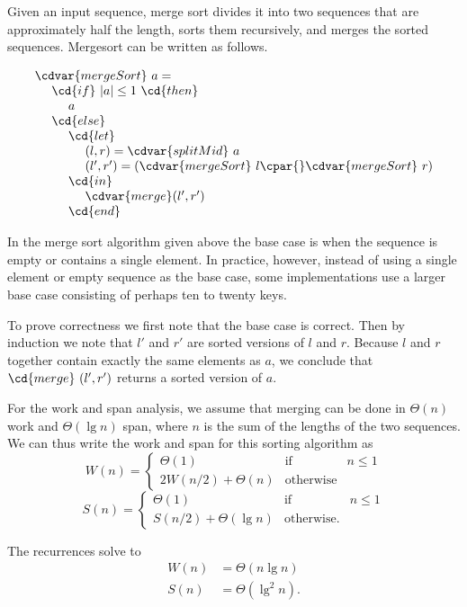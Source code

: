 \begin{algorithm}
\label{alg:design::dc::mergesort}

Given an input sequence, merge sort divides it into two sequences that
are approximately half the length, sorts them recursively, and merges
the sorted sequences.
%
Mergesort can be written as follows.

\[
\begin{array}{l}
\cdvar{mergeSort}~a =
\\ 
~~~~\cd{if}~|a| \leq 1~\cd{then}
\\ 
~~~~~~~~a
\\
~~~~\cd{else}
\\ 
~~~~~~~~\cd{let}
\\
~~~~~~~~~~~~(l,r) = \cdvar{splitMid}~a
\\ 
~~~~~~~~~~~~(l',r') = (\cdvar{mergeSort}~l \cpar{} \cdvar{mergeSort}~r)
\\
~~~~~~~~\cd{in}
\\ 
~~~~~~~~~~~~\cdvar{merge} (l',r')
\\
~~~~~~~~\cd{end}
\end{array} 
\]
\end{algorithm}


\begin{note}
In the merge sort algorithm given above the base case is when the
sequence is empty or contains a single element.  In practice, however,
instead of using a single element or empty sequence as the base case,
some implementations use a larger base case consisting of perhaps ten
to twenty keys.
%
\end{note}

\begin{gram}

To prove correctness we first note that the base case is correct.
Then by induction we note that $l'$ and $r'$ are sorted
versions of $l$ and $r$.
%
Because $l$ and $r$ together contain exactly the same elements as $a$,
we conclude that $\cd{merge}~(l',r')$ returns a sorted version of $a$.


For the work and span analysis, we assume that merging can be done in $\Theta(n)$ work and $\Theta(\lg{n})$ span, where $n$ is the sum of the lengths of the two sequences.
%
We can thus write the work and span for this sorting algorithm
as
\[
W(n) = \left\{
\begin{array}{lll}
\Theta(1) & \mbox{if} & n \le 1
\\
2W(n/2) + \Theta(n) &  \mbox{otherwise}
\end{array}
\right.
\]
%
\[
S(n) = \left\{
\begin{array}{lll}
\Theta(1) & \mbox{if} & n \le 1
\\
S(n/2) + \Theta(\lg{n}) &  \mbox{otherwise}.
\end{array}
\right.
\]

The recurrences solve to
\begin{align*}
W(n) & = \Theta(n\lg{n})
\\
S(n) & = \Theta(\lg^2{n}).
\end{align*}
\end{gram}
%

